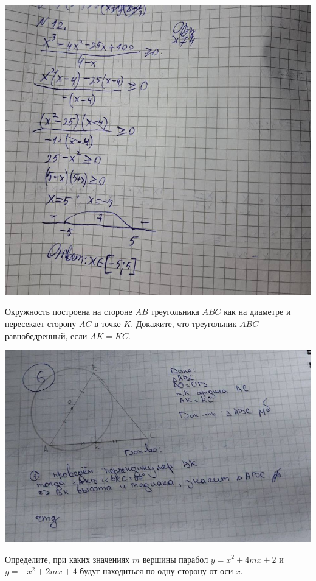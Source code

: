 \documentclass[10pt,]{article}
\begin{document}
\begin{listofex}
\begin{center}
		\includegraphics[align=t, width=1\linewidth]{../exercises/lists/pics/curator3}
	\end{center}
\newpage
	\item Окружность построена на стороне \( AB \) треугольника \( ABC \) как на диаметре и пересекает сторону \( AC \) в точке \( K \). Докажите, что треугольник \( ABC \) равнобедренный, если \( AK=KC \).
	 \begin{center}
	 	\includegraphics[align=t, width=1\linewidth]{../exercises/lists/pics/curator4}
	 \end{center}
 \newpage
 	\item Определите, при каких значениях \( m \) вершины парабол \( y=x^2+4mx+2 \) и \( y=-x^2+2mx+4 \) будут находиться по одну сторону от оси \( x \).

\end{listofex}
\end{document}
